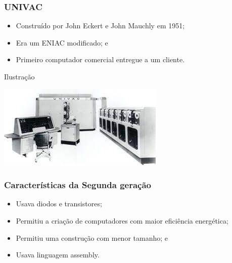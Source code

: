 \documentclass[aspectratio=169]{beamer} %
\begin{document}
\begin{frame}
	\frametitle{UNIVAC}
	
	\begin{itemize}
		\item Construído por John Eckert e John Mauchly em 1951;
		\item Era um ENIAC modificado; e
		\item Primeiro computador comercial entregue a um cliente.
	\end{itemize}\vfill
	
	\begin{exampleblock}{Ilustra\c cão}
		\begin{center}
			\includegraphics[scale=0.5]{img/univac}
		\end{center}
	\end{exampleblock}
\end{frame}

\begin{frame}
	\frametitle{Características da Segunda gera\c cão}

	\begin{itemize}
		\item Usava diodos e transistores;
		\item Permitiu a criação de computadores com maior eficiência energética;
		\item Permitiu uma constru\c cão com menor tamanho; e
		\item Usava linguagem assembly.
	\end{itemize}	
\end{frame}
\end{document}
